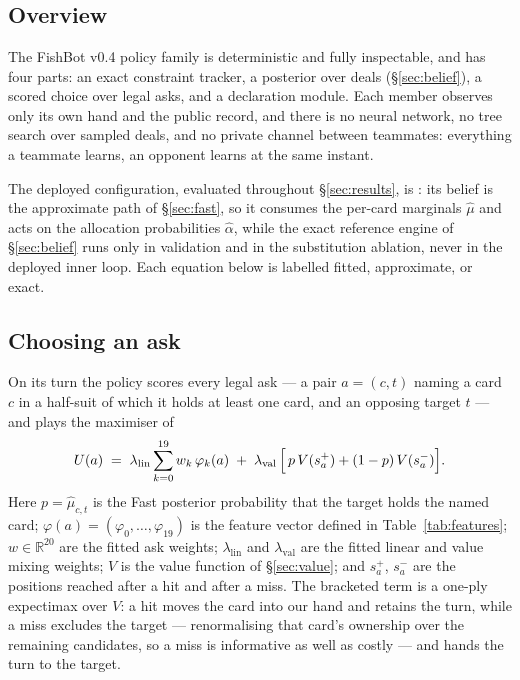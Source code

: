 \section{\vfast{}}
\label{sec:policy}

\subsection{Overview}

The FishBot v0.4 policy family is deterministic and fully inspectable, and has
four parts: an exact constraint tracker, a posterior over deals
(\S\ref{sec:belief}), a scored choice over legal asks, and a declaration
module. Each member observes only its own hand and the public record, and
there is no neural network, no tree search over sampled deals, and no private
channel between teammates: everything a teammate learns, an opponent learns at
the same instant.

The deployed configuration, evaluated throughout \S\ref{sec:results}, is
\vfast{}: its belief is the approximate path of \S\ref{sec:fast}, so it
consumes the per-card marginals $\hat\mu$ and acts on the allocation
probabilities $\hat\alpha$, while the exact reference engine of
\S\ref{sec:belief} runs only in validation and in the \vblock{} substitution
ablation, never in the deployed inner loop. Each equation below is labelled
fitted, approximate, or exact.

\subsection{Choosing an ask}
\label{sec:ask}

On its turn the policy scores every legal ask --- a pair $a = (c, t)$ naming a
card $c$ in a half-suit of which it holds at least one card, and an opposing
target $t$ --- and plays the maximiser of
\begin{equation}
  U(a) \;=\; \lambda_{\mathrm{lin}} \sum_{k=0}^{19} w_k\, \varphi_k(a)
       \;+\; \lambda_{\mathrm{val}}\,\Bigl[\, p\, V(s^{+}_a) + (1-p)\, V(s^{-}_a) \Bigr].
  \label{eq:askutil}
\end{equation}
Here $p = \hat\mu_{c,t}$ is the Fast posterior probability that the target
holds the named card; $\varphi(a) = (\varphi_0,\dots,\varphi_{19})$ is the
feature vector defined in Table~\ref{tab:features}; $w \in \mathbb{R}^{20}$
are the fitted ask weights; $\lambda_{\mathrm{lin}}$ and
$\lambda_{\mathrm{val}}$ are the fitted linear and value mixing weights; $V$
is the value function of \S\ref{sec:value}; and $s^{+}_a$, $s^{-}_a$ are the
positions reached after a hit and after a miss. The bracketed term is a
one-ply expectimax over $V$: a hit moves the card into our hand and retains
the turn, while a miss excludes the target --- renormalising that card's
ownership over the remaining candidates, so a miss is informative as well as
costly --- and hands the turn to the target.


